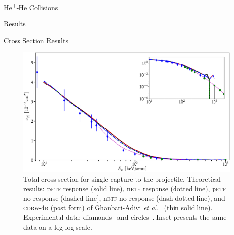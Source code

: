 \documentclass[letterpaper, 11 pt]{report}
\begin{document}
\begin{chapter}{\texorpdfstring{He\textsuperscript{+}}{He+}-He Collisions \label{chap:hephe}}
\begin{section}{Results \label{sec:hephe-disc}}
\begin{subsection}{Cross Section Results \label{sec:hephe-res}}
         \begin{figure}[t]
            \centering
            \includegraphics[width = \linewidth]{./images/hephe-cross/HepHe-120.eps}
            \caption[Total cross section for single capture to the projectile He\textsuperscript{+}-He
                     collisions.]
                    {Total cross section for single capture to the projectile.
                     Theoretical results: p\textsc{etf} response (solid line), n\textsc{etf} response
                                          (dotted line), p\textsc{etf} no-response (dashed line),
                                          n\textsc{etf} no-response (dash-dotted line), and
                                          \textsc{cdbw-4b} (post form) of Ghanbari-Adivi
                                          \textit{et al}.~\cite{GAG15} (thin solid line).
                     Experimental data: diamonds~\cite{Dub-89} and circles~\cite{FTFHLP-95}.
                     Inset presents the same data on a log-log scale.
                     \label{fig:cs120}}
         \end{figure}


\end{subsection}
\end{section}
\end{chapter}
\end{document}
